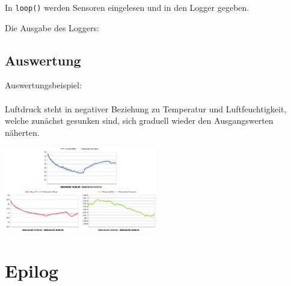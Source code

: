 \documentclass[ngerman]{schoolPres}
\begin{document}
  \begin{frame}[fragile]
    In \texttt{loop()} werden Sensoren eingelesen und in den Logger gegeben.\\
    
  \end{frame}

  \begin{frame}[fragile]
    Die Ausgabe des Loggers:\\
    
  \end{frame}

  \subsection{Auswertung}
  \begin{frame}
    Auswertungsbeispiel:\\~\\

    Luftdruck steht in negativer Beziehung zu Temperatur und Luftfeuchtigkeit, welche zunächst gesunken sind, sich graduell wieder den Ausgangswerten näherten.

    \begin{center}
      \includegraphics[width=0.5\textwidth]{media/data.pdf}
    \end{center}

  \end{frame}

  \section{Epilog}%
\end{document}
